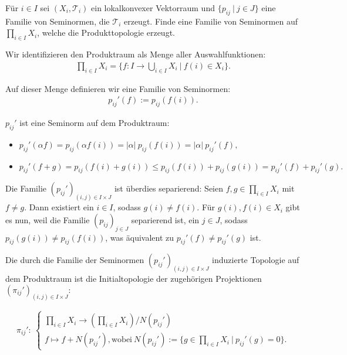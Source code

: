\begin{exercise}
Für $i \in I$ sei $(X_i, \mathcal{T}_i)$ ein lokalkonvexer Vektorraum und
$\{p_{ij} ~|~ j \in J\}$ eine Familie von Seminormen, die $\mathcal{T}_i$ erzeugt.
Finde eine Familie von Seminormen auf $\prod_{i \in I} X_i$, welche die Produkttopologie erzeugt.

\end{exercise}

\begin{solution}



Wir identifizieren den Produktraum als Menge aller Auswahlfunktionen:
\begin{align*}
    \prod_{i \in I} X_i = \{f: I \rightarrow \bigcup_{i \in I} X_i ~|~ f(i) \in X_i\}.
\end{align*}

Auf dieser Menge definieren wir eine Familie von Seminormen:
\begin{align*}
    p_{ij}'(f) := p_{ij}(f(i)).
\end{align*}

$p_{ij}'$ ist eine Seminorm auf dem Produktraum:

\begin{itemize}
    \item $p_{ij}'(\alpha f) = p_{ij}(\alpha f(i)) = |\alpha|~ p_{ij}(f(i)) = |\alpha|~ p_{ij}'(f),$

    \item $p_{ij}'(f + g) = p_{ij}(f(i) + g(i)) \leq p_{ij}(f(i)) + p_{ij}(g(i)) = p_{ij}'(f) + p_{ij}'(g).$
\end{itemize}

Die Familie $(p_{ij}')_{(i,j) \in I \times J}$ ist überdies separierend: Seien $f, g \in \prod_{i \in I} X_i$ mit $f \neq g$. Dann existiert ein $i \in I$, sodass $g(i) \neq f(i)$. Für $g(i), f(i) \in X_i$ gibt es nun, weil die Familie $(p_{ij})_{j \in J}$ separierend ist, ein $j \in J$, sodass $p_{ij}(g(i)) \neq p_{ij}(f(i))$, was äquivalent zu $p_{ij}'(f) \neq p_{ij}'(g)$ ist.

Die durch die Familie der Seminormen $(p_{ij}')_{(i,j) \in I \times J}$ induzierte Topologie auf dem Produktraum ist die Initialtopologie der zugehörigen Projektionen $(\pi_{ij}')_{(i,j) \in I \times J}:$

\begin{align*}
  \pi_{ij}':
  ~\begin{cases}
    \prod_{i \in I} X_i \rightarrow (\prod_{i \in I} X_i) / N(p_{ij}')\\
    f \mapsto f + N(p_{ij}'), \text{wobei}~ N(p_{ij}') := \{g \in \prod_{i \in I} X_i ~|~ p_{ij}'(g) = 0\}.
  \end{cases}
\end{align*}


\end{solution}
